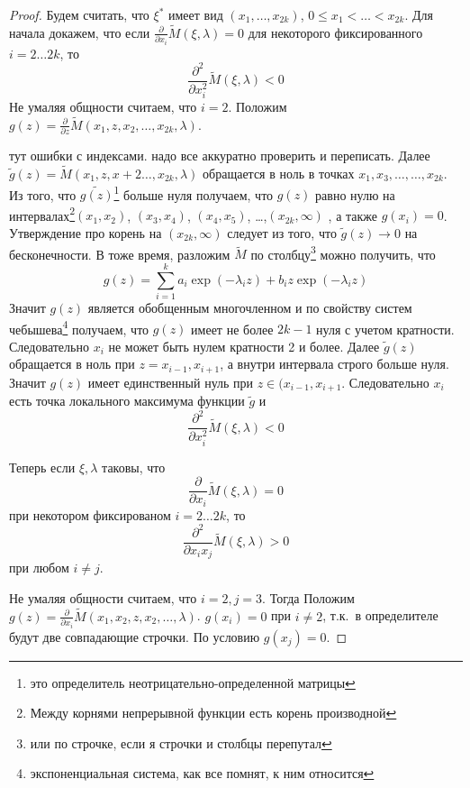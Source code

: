 \begin{proof}
Будем считать, что $\xi^{*}$ имеет вид $(x_1, …, x_{2k})$, $0 \leq x_1 < … < x_{2k}$.  Для начала докажем, что если 
$\frac{\partial}{\partial x_i} \tilde{M}(\xi,\lambda)=0$ для некоторого фиксированного $i=2…2k$, то 
$$\frac{\partial^2}{\partial x_i^2} \tilde{M}(\xi, \lambda) < 0$$
Не умаляя общности считаем, что $i=2$. 
Положим $g(z) = \frac{\partial}{\partial z}\tilde{M}(x_1,z, x_2, …, x_{2k}, \lambda)$. 

{\color{red} тут ошибки с индексами. надо все аккуратно проверить и переписать. }
Далее $\tilde{g}(z) = \tilde{M}(x_1,z, x+2 …, x_{2k}, \lambda)$ обращается в ноль в точках $x_1, x_3, …, …, x_{2k}$. 
Из того, что $\tilde{g(z)}$\footnote{это определитель неотрицательно-определенной матрицы} больше нуля получаем, что $g(z)$ равно нулю на интервалах\footnote{Между корнями непрерывной функции есть корень производной}$(x_1, x_2)$, $(x_{3}, x_{4})$, $(x_{4}, x_{5})$, …,$(x_{2k}, \infty)$ 
, а также $g(x_i) = 0$. Утверждение про корень на $(x_{2k}, \infty)$ следует из того, что $\tilde{g}(z) \rightarrow 0$ на бесконечности.
 В тоже время, разложим $\tilde{M}$ по столбцу\footnote{или по строчке, если я строчки и столбцы перепутал} можно получить, что 
$$g(z) = \sum_{i=1}^k a_i \exp(-\lambda_i z) + b_i z \exp(-\lambda_i z)$$
Значит $g(z)$ является обобщенным многочленном и по свойству систем чебышева\footnote{экспоненциальная система, как все помнят, к ним относится} получаем, что $g(z)$ имеет не более $2k-1$ нуля с учетом кратности.  Следовательно $x_i$ не может быть нулем кратности 2 и более. Далее $\tilde{g}(z)$ обращается в ноль при $z=x_{i-1}, x_{i+1}$, а внутри интервала строго больше нуля. Значит $g(z)$ имеет единственный нуль при $z \in (x_{i-1}, x_{i+1}$. Следовательно $x_i$ есть точка локального максимума функции $\tilde{g}$ и 
$$\frac{\partial^2}{\partial x_i^2}\tilde{M}(\xi, \lambda) < 0$$

Теперь если $\xi, \lambda$ таковы, что 
$$\frac{\partial}{\partial x_i} \tilde{M}(\xi, \lambda) = 0$$
при некотором фиксированом $i=2…2k$, то
$$\frac{\partial^2}{\partial x_i x_j} \tilde{M}(\xi, \lambda) > 0 $$
при любом $i \neq j$. 

Не умаляя общности считаем, что $i=2, j=3$. Тогда  
Положим $g(z) = \frac{\partial}{\partial x_i}\tilde{M}(x_1,x_2, z, x_2,…, \lambda)$. $g(x_i)=0$ при $i \neq 2$, т.к. в определителе будут две совпадающие строчки. По условию $g(x_j) = 0$. 


\end{proof}
